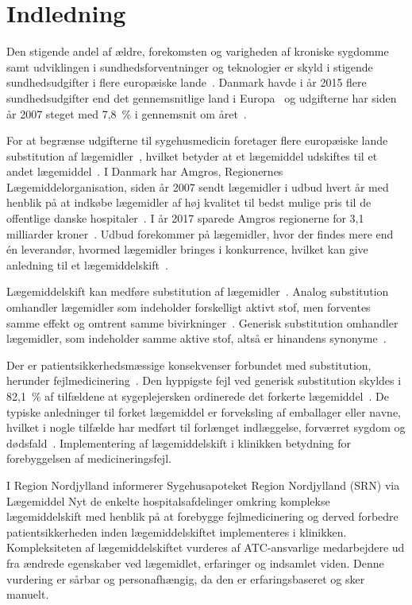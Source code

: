 \chapter{Indledning}
Den stigende andel af ældre, forekomsten og varigheden af kroniske sygdomme samt udviklingen i sundhedsforventninger og teknologier er skyld i stigende sundhedsudgifter i flere europæiske lande~\citep{Ess2003}. Danmark havde i år 2015 flere sundhedsudgifter end det gennemsnitlige land i Europa~\citep{EU2017} og udgifterne har siden år 2007 steget med 7,8~\% i gennemsnit om året~\citep{Sundhed2016}.

For at begrænse udgifterne til sygehusmedicin foretager flere europæiske lande substitution af lægemidler~\citep{Ess2003,Johnston2011}, hvilket betyder at et lægemiddel udskiftes til et andet lægemiddel~\citep{DanskSelskabforPatientsikkerhed2009, Kairi2017}. I Danmark har Amgros, Regionernes Lægemiddelorganisation, siden år 2007 sendt lægemidler i udbud hvert år med henblik på at indkøbe lægemidler af høj kvalitet til bedst mulige pris til de offentlige danske hospitaler~\citep{Amgros2018b}. I år 2017 sparede Amgros regionerne for 3,1 milliarder kroner~\citep{Amgros2017b}. Udbud forekommer på lægemidler, hvor der findes mere end én leverandør, hvormed lægemidler bringes i konkurrence, hvilket kan give anledning til et lægemiddelskift~\citep{Amgros2015}.

Lægemiddelskift kan medføre substitution af lægemidler~\citep{DanskSelskabforPatientsikkerhed2009}.  
Analog substitution omhandler lægemidler som indeholder forskelligt aktivt stof, men forventes samme effekt og omtrent samme bivirkninger~\citep{DanskSelskabforPatientsikkerhed2009,Kairi2017}. 
Generisk substitution omhandler lægemidler, som indeholder samme aktive stof, altså er hinandens synonyme~\citep{DanskSelskabforPatientsikkerhed2009,Kairi2017}. 

Der er patientsikkerhedsmæssige konsekvenser forbundet med substitution, herunder fejlmedicinering~\citep{Hakonsen2010}. Den hyppigste fejl ved generisk substitution skyldes i 82,1~\% af tilfældene at sygeplejersken ordinerede det forkerte lægemiddel~\citep{Hakonsen2010}. De typiske anledninger til forket lægemiddel er forveksling af emballager eller navne, hvilket i nogle tilfælde har medført til forlænget indlæggelse, forværret sygdom og dødsfald~\citep{DanskSelskabforPatientsikkerhed2009}. Implementering af lægemiddelskift i klinikken betydning for forebyggelsen af medicineringsfejl.

I Region Nordjylland informerer Sygehusapoteket Region Nordjylland (SRN) via Lægemiddel Nyt de enkelte hospitalsafdelinger omkring komplekse lægemiddelskift med henblik på at forebygge fejlmedicinering og derved forbedre patientsikkerheden inden lægemiddelskiftet implementeres i klinikken. Kompleksiteten af lægemiddelskiftet vurderes af ATC-ansvarlige medarbejdere ud fra ændrede egenskaber ved lægemidlet, erfaringer og indsamlet viden. Denne vurdering er sårbar og personafhængig, da den er erfaringsbaseret og  sker manuelt. 


